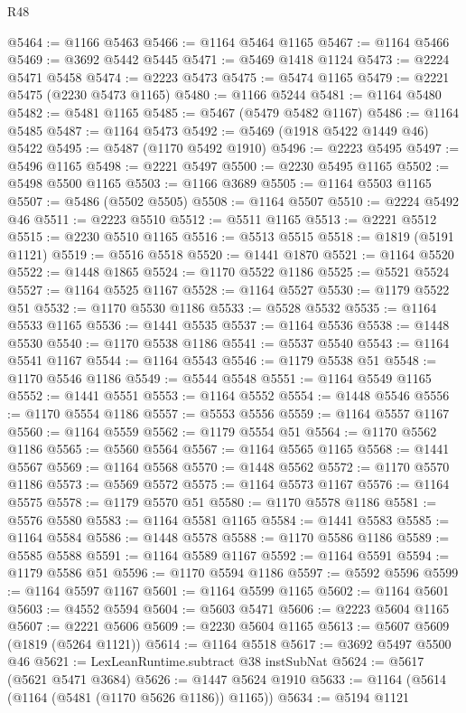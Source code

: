 \begin{lexlean}{R48}
\begin{coremodule}
@5464 := @1166 @5463
@5466 := @1164 @5464 @1165
@5467 := @1164 @5466
@5469 := @3692 @5442 @5445
@5471 := @5469 @1418 @1124
@5473 := @2224 @5471 @5458
@5474 := @2223 @5473
@5475 := @5474 @1165
@5479 := @2221 @5475 (@2230 @5473 @1165)
@5480 := @1166 @5244
@5481 := @1164 @5480
@5482 := @5481 @1165
@5485 := @5467 (@5479 @5482 @1167)
@5486 := @1164 @5485
@5487 := @1164 @5473
@5492 := @5469 (@1918 @5422 @1449 @46) @5422
@5495 := @5487 (@1170 @5492 @1910)
@5496 := @2223 @5495
@5497 := @5496 @1165
@5498 := @2221 @5497
@5500 := @2230 @5495 @1165
@5502 := @5498 @5500 @1165
@5503 := @1166 @3689
@5505 := @1164 @5503 @1165
@5507 := @5486 (@5502 @5505)
@5508 := @1164 @5507
@5510 := @2224 @5492 @46
@5511 := @2223 @5510
@5512 := @5511 @1165
@5513 := @2221 @5512
@5515 := @2230 @5510 @1165
@5516 := @5513 @5515
@5518 := @1819 (@5191 @1121)
@5519 := @5516 @5518
@5520 := @1441 @1870
@5521 := @1164 @5520
@5522 := @1448 @1865
@5524 := @1170 @5522 @1186
@5525 := @5521 @5524
@5527 := @1164 @5525 @1167
@5528 := @1164 @5527
@5530 := @1179 @5522 @51
@5532 := @1170 @5530 @1186
@5533 := @5528 @5532
@5535 := @1164 @5533 @1165
@5536 := @1441 @5535
@5537 := @1164 @5536
@5538 := @1448 @5530
@5540 := @1170 @5538 @1186
@5541 := @5537 @5540
@5543 := @1164 @5541 @1167
@5544 := @1164 @5543
@5546 := @1179 @5538 @51
@5548 := @1170 @5546 @1186
@5549 := @5544 @5548
@5551 := @1164 @5549 @1165
@5552 := @1441 @5551
@5553 := @1164 @5552
@5554 := @1448 @5546
@5556 := @1170 @5554 @1186
@5557 := @5553 @5556
@5559 := @1164 @5557 @1167
@5560 := @1164 @5559
@5562 := @1179 @5554 @51
@5564 := @1170 @5562 @1186
@5565 := @5560 @5564
@5567 := @1164 @5565 @1165
@5568 := @1441 @5567
@5569 := @1164 @5568
@5570 := @1448 @5562
@5572 := @1170 @5570 @1186
@5573 := @5569 @5572
@5575 := @1164 @5573 @1167
@5576 := @1164 @5575
@5578 := @1179 @5570 @51
@5580 := @1170 @5578 @1186
@5581 := @5576 @5580
@5583 := @1164 @5581 @1165
@5584 := @1441 @5583
@5585 := @1164 @5584
@5586 := @1448 @5578
@5588 := @1170 @5586 @1186
@5589 := @5585 @5588
@5591 := @1164 @5589 @1167
@5592 := @1164 @5591
@5594 := @1179 @5586 @51
@5596 := @1170 @5594 @1186
@5597 := @5592 @5596
@5599 := @1164 @5597 @1167
@5601 := @1164 @5599 @1165
@5602 := @1164 @5601
@5603 := @4552 @5594
@5604 := @5603 @5471
@5606 := @2223 @5604 @1165
@5607 := @2221 @5606
@5609 := @2230 @5604 @1165
@5613 := @5607 @5609 (@1819 (@5264 @1121))
@5614 := @1164 @5518
@5617 := @3692 @5497 @5500 @46
@5621 := LexLeanRuntime.subtract @38 instSubNat
@5624 := @5617 (@5621 @5471 @3684)
@5626 := @1447 @5624 @1910
@5633 := @1164 (@5614 (@1164 (@5481 (@1170 @5626 @1186)) @1165))
@5634 := @5194 @1121

\end{coremodule}
\end{lexlean}
